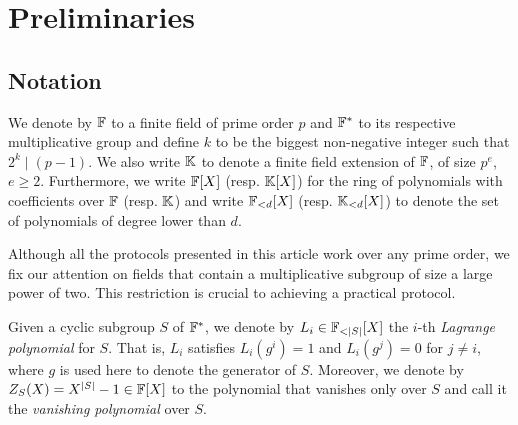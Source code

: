 \section{Preliminaries}\label{sec:preliminaries}

\subsection{Notation}


We denote by $\mathbb{F}$ to a finite field of prime order $p$ and $\mathbb{F}^*$ to its respective multiplicative group and define $k$ to be the biggest non-negative integer such that $2^k \mid (p-1)$. We also write $\mathbb{K}$ to denote a finite field extension of $\mathbb{F}$, of size $p^e$, $e \geq 2$. 
Furthermore, we write $\mathbb{F}[X]$ (resp. $\mathbb{K}[X]$) for the ring of polynomials with coefficients over $\mathbb{F}$ (resp. $\mathbb{K}$) and write $\mathbb{F}_{<d}[X]$ (resp. $\mathbb{K}_{<d}[X]$) to denote the set of polynomials of degree lower than $d$.

Although all the protocols presented in this article work over any prime order, we fix our attention on fields that contain a multiplicative subgroup of size a large power of two. This restriction is crucial to achieving a practical protocol.


Given a cyclic subgroup $S$ of $\mathbb{F}^*$, we denote by $L_i \in \FF_{<|S|}[X]$ the $i$-th \textit{Lagrange polynomial} for $S$. That is, $L_i$ satisfies $L_i(g^i) = 1$ and $L_i(g^j) = 0$ for $j \neq i$, where $g$ is used here to denote the generator of $S$. Moreover, we denote by $Z_S(X) = X^{|S|} - 1 \in \mathbb{F}[X]$ to the polynomial that vanishes only over $S$ and call it the \textit{vanishing polynomial} over $S$.

